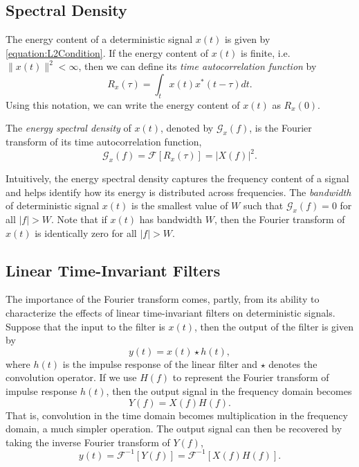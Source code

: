 \subsection{Spectral Density}
\label{subsection:SpectralDensity}

The energy content of a deterministic signal $x(t)$ is given by \eqref{equation:L2Condition}.
If the energy content of $x(t)$ is finite, i.e.\ $\| x(t) \|^2 < \infty$, then we can define its \emph{time autocorrelation function} by
\begin{equation*}
R_x(\tau) = \int_t x(t)x^*(t - \tau) dt .
\end{equation*}
Using this notation, we can write the energy content of $x(t)$ as $R_x(0)$.

\begin{definition}
The \emph{energy spectral density} of $x(t)$, denoted by $\mathcal{G}_x (f)$, is the Fourier transform of its time autocorrelation function,
\begin{equation*}
\mathcal{G}_x (f) = \mathcal{F} [ R_x (\tau) ] = | X(f) |^2.
\end{equation*}
\end{definition}

Intuitively, the energy spectral density captures the frequency content of a signal and helps identify how its energy is distributed across frequencies.
The \emph{bandwidth} of deterministic signal $x(t)$ is the smallest value of $W$ such that $\mathcal{G}_x (f) = 0$ for all $|f| > W$.
Note that if $x(t)$ has bandwidth $W$, then the Fourier transform of $x(t)$ is identically zero for all $|f| > W$.


\subsection{Linear Time-Invariant Filters}
\label{subsection:LinearTimeInvariantFilters}

The importance of the Fourier transform comes, partly, from its ability to characterize the effects of linear time-invariant filters on deterministic signals.
Suppose that the input to the filter is $x(t)$, then the output of the filter is given by
\begin{equation*}
y(t) = x(t) \star h(t),
\end{equation*}
where $h(t)$ is the impulse response of the linear filter and $\star$ denotes the convolution operator.
If we use $H(f)$ to represent the Fourier transform of impulse response $h(t)$, then the output signal in the frequency domain becomes
\begin{equation*}
Y(f) = X(f) H(f) .
\end{equation*}
That is, convolution in the time domain becomes multiplication in the frequency domain, a much simpler operation.
The output signal can then be recovered by taking the inverse Fourier transform of $Y(f)$,
\begin{equation*}
y(t) = \mathcal{F}^{-1} [ Y(f) ] = \mathcal{F}^{-1} [ X(f) H(f) ] .
\end{equation*}
